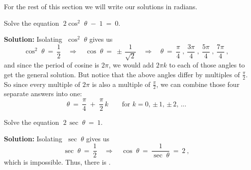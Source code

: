 For the rest of this section we will write our solutions in radians.
\newpage
\begin{exmp}
 Solve the equation $\;2\cos^2 \;\theta \;-\; 1 ~=~ 0$.\vspace{1mm}
 \par\noindent\textbf{Solution:} Isolating $\;\cos^2 \;\theta$ gives us
 \begin{displaymath}
  \cos^2 \;\theta ~=~ \frac{1}{2} \quad\Rightarrow\quad \cos\;\theta ~=~ \pm\,\frac{1}{\sqrt{2}}
  \quad\Rightarrow\quad \theta ~=~ \frac{\pi}{4}\;,~\frac{3\pi}{4}\;,~\frac{5\pi}{4}\;,~
  \frac{7\pi}{4}~,
 \end{displaymath}
 and since the period of cosine is $2\pi$, we would add $2\pi k$ to each of those angles to get the
 general solution. But notice that the above angles differ by multiples of $\frac{\pi}{2}$. So since
 every multiple of $2\pi$ is also a multiple of $\frac{\pi}{2}$, we can combine those four separate
 answers into one:
 \begin{displaymath}
  \boxed{\theta ~=~ \frac{\pi}{4} \;+\; \frac{\pi}{2}\,k}
  \qquad\text{for $k=0$, $\pm\,1$, $\pm\,2$, $...$}
 \end{displaymath}
\end{exmp}
\begin{exmp}
 Solve the equation $\;2\,\sec\;\theta ~=~ 1$.\vspace{1mm}
 \par\noindent\textbf{Solution:} Isolating $\;\sec\;\theta$ gives us
 \begin{displaymath}
  \sec\;\theta ~=~ \frac{1}{2} \quad\Rightarrow\quad \cos\;\theta ~=~ \frac{1}{\sec\;\theta} ~=~ 2~,
 \end{displaymath}
 which is impossible. Thus, there is \;.
\end{exmp}
